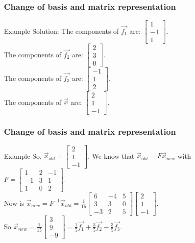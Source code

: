 \begin{frame}
	\frametitle{Change of basis and matrix representation}
	\begin{block}{Example}
		Solution: The components of $\overrightarrow{f_1}$ are: $\begin{bmatrix} 1\\-1\\1\end{bmatrix}$.\\
		The components of $\overrightarrow{f_2}$ are: $\begin{bmatrix} 2\\3\\0\end{bmatrix}$.\\
		The components of $\overrightarrow{f_3}$ are: $\begin{bmatrix} -1\\1\\2\end{bmatrix}$.\\
		The components of $\overrightarrow{x}$ are: $\begin{bmatrix} 2\\1\\-1\end{bmatrix}$.
	\end{block}
\end{frame}

\begin{frame}
	\frametitle{Change of basis and matrix representation}
	\begin{block}{Example}
		So, $\overrightarrow{x}_{old}=\begin{bmatrix} 2\\1\\-1\end{bmatrix}$. We know that $\overrightarrow{x}_{old}=F\overrightarrow{x}_{new}$ with $F=\begin{bmatrix}
		1 & 2 & -1 \\
		-1 & 3 & 1\\
		1 & 0 & 2
		\end{bmatrix}$.\\
		Now is $\overrightarrow{x}_{new}=F^{-1}\overrightarrow{x}_{old}=
		\frac{1}{15} \begin{bmatrix} 
		6 & -4 & 5\\
		3 & 3 & 0\\
		-3 & 2 & 5\end{bmatrix} \begin{bmatrix}
		2\\1\\-1
		\end{bmatrix}$.\\
		So $\overrightarrow{x}_{new}=\frac{1}{15} \begin{bmatrix}
		3\\9\\-9
		\end{bmatrix}= \frac{1}{5} \overrightarrow{f_1}+\frac{3}{5}\overrightarrow{f_2}-\frac{3}{5} \overrightarrow{f_3}$.
	\end{block}
\end{frame}

